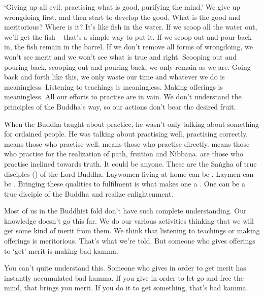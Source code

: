 `Giving up all evil, practising what is good, purifying the mind.' We give up wrongdoing first, and then start to develop the good. What is the good and meritorious? Where is it? It's like fish in the water. If we scoop all the water out, we'll get the fish -- that's a simple way to put it. If we scoop out and pour back in, the fish remain in the barrel. If we don't remove all forms of wrongdoing, we won't see merit and we won't see what is true and right. Scooping out and pouring back, scooping out and pouring back, we only remain as we are. Going back and forth like this, we only waste our time and whatever we do is meaningless. Listening to teachings is meaningless. Making offerings is meaningless. All our efforts to practise are in vain. We don't understand the principles of the Buddha's way, so our actions don't bear the desired fruit.

When the Buddha taught about practice, he wasn't only talking about something for ordained people. He was talking about practising well, practising correctly.  means those who practise well.  means those who practise directly.  means those who practise for the realization of path, fruition and Nibb\=ana.  are those who practise inclined towards truth. It could be anyone. These are the Sa\.ngha of true disciples () of the Lord Buddha. Laywomen living at home can be . Laymen can be . Bringing these qualities to fulfilment is what makes one a . One can be a true disciple of the Buddha and realize enlightenment.

Most of us in the Buddhist fold don't have such complete understanding. Our knowledge doesn't go this far. We do our various activities thinking that we will get some kind of merit from them. We think that listening to teachings or making offerings is meritorious. That's what we're told. But someone who gives offerings to `get' merit is making bad kamma.

You can't quite understand this. Someone who gives in order to get merit has instantly accumulated bad kamma. If you give in order to let go and free the mind, that brings you merit. If you do it to get something, that's bad kamma.


